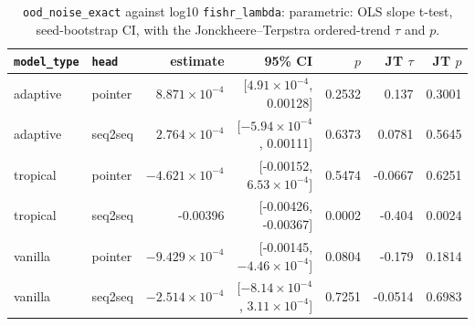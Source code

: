 \documentclass[10pt]{article}
\begin{document}
{\small
\begin{longtable}{llrrrrr}
\caption{\texttt{ood\_noise\_exact} against log10 \texttt{fishr\_lambda}: parametric: OLS slope t-test, seed-bootstrap CI, with the Jonckheere--Terpstra ordered-trend $\tau$ and $p$.}\label{tab:trend-ood_noise_exact}\\
\toprule
\texttt{model\_type} & \texttt{head} & estimate & 95\% CI & $p$ & JT $\tau$ & JT $p$\\
\midrule
\endhead
adaptive & pointer & $8.871\times10^{-4}$ & [$4.91\times10^{-4}$, 0.00128] & 0.2532 & 0.137 & 0.3001\\
adaptive & seq2seq & $2.764\times10^{-4}$ & [$-5.94\times10^{-4}$, 0.00111] & 0.6373 & 0.0781 & 0.5645\\
tropical & pointer & $-4.621\times10^{-4}$ & [-0.00152, $6.53\times10^{-4}$] & 0.5474 & -0.0667 & 0.6251\\
tropical & seq2seq & -0.00396 & [-0.00426, -0.00367] & 0.0002 & -0.404 & 0.0024\\
vanilla & pointer & $-9.429\times10^{-4}$ & [-0.00145, $-4.46\times10^{-4}$] & 0.0804 & -0.179 & 0.1814\\
vanilla & seq2seq & $-2.514\times10^{-4}$ & [$-8.14\times10^{-4}$, $3.11\times10^{-4}$] & 0.7251 & -0.0514 & 0.6983\\
\bottomrule
\end{longtable}
}
\end{document}
